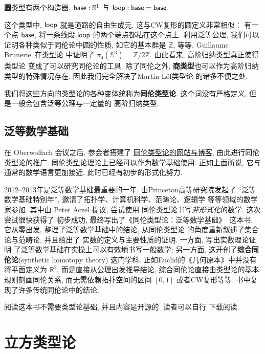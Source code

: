 \begin{definition}
\textbf{圆}类型有两个构造器, \(\textsf{base} : \mathbb S^1\)
与 \(\textsf{loop} : \textsf{base} = \textsf{base}\).
\end{definition}
这个类型中, \(\textsf{loop}\) 就是道路的自由生成元.
这与CW复形的圆定义非常相似： 有一个点 \(\textsf{base}\),
将一条线段 \(\textsf{loop}\) 的两个端点都粘在这个点上.
利用泛等公理, 我们可以证明各种类似于同伦论中圆的性质,
如它的基本群是 \(\mathbb Z\), 等等.
Guillaume Brunerie~\cite{brunerie:2016:number}在类型论
中证明了 \(\pi_4(\mathbb S^3) = \mathbb Z / 2\mathbb Z\).
由此看来, 高阶归纳类型真正使得类型论
变成了可以研究同伦论的工具.
除了同伦之外, \textbf{商类型}也可以作为高阶归纳
类型的特殊情况存在. 因此我们完全解决了Martin-L\"of类型论
的诸多不便之处.

我们将这些方向的类型论的各种变体统称为\textbf{同伦类型论}.
这个词没有严格定义, 但是一般会包含泛等公理与一定量的
高阶归纳类型.

\subsection{泛等数学基础}
在 Oberwolfach 会议之后, 参会者搭建了%
\href{http://homotopytypetheory.org/}{同伦类型论的网站与博客},
由此进行同伦类型论的推广.
同伦类型论理论上已经可以作为数学基础使用. 正如上面所说, 它与
通常的数学语言更加接近. 此时已经有初步的形式化努力.

2012--2013年是泛等数学基础最重要的一年. 由Princeton高等研究院发起了
“泛等数学基础特别年”, 邀请了拓扑学、计算机科学、范畴论、逻辑学
等等领域的数学家参加. 其中由 Peter Aczel 提议, 尝试使用
同伦类型论书写\emph{非形式化}的数学. 这次尝试很快获得了
初步成功, 最终写出了《同伦类型论：泛等数学基础》~\cite{ufp:2013:hottbook}这本书.
它从零出发, 整理了泛等数学基础中的结论, 从同伦类型论
的角度重新叙述了集合论与范畴论, 并且给出了
实数的定义与主要性质的证明. 一方面, 写出实数理论证明
了泛等数学基础在实操上可以有效地书写一般数学; 另一方面,
这开创了\textbf{综合同伦论}(synthetic homotopy theory)
这门学科. 正如Euclid的《几何原本》中并没有将平面定义为
\(\mathbb R^2\), 而是直接从公理出发推导结论,
综合同伦论直接由类型论的基本规则刻画同伦关系,
而无需依赖拓扑空间的区间 \([0,1]\) 或者CW复形等等.
书中复现了许多传统同伦论中的结论.

阅读这本书不需要类型论基础, 并且内容是开源的. 读者可以自行
下载阅读.

\section{立方类型论}


